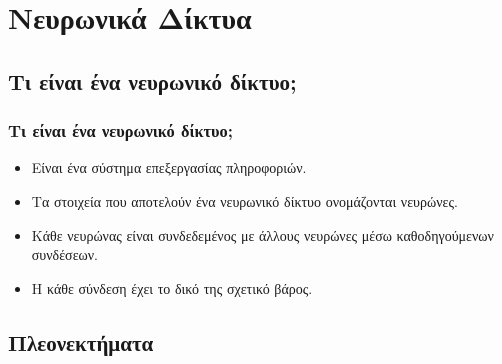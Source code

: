 \documentclass[xetex,serif,mathserif,14pt]{beamer}
\begin{document}
\section{Νευρωνικά Δίκτυα} %

\subsection{Τι είναι ένα νευρωνικό δίκτυο;}

\begin{frame}
\frametitle{Τι είναι ένα νευρωνικό δίκτυο;}
\begin{itemize}
\pause
  \item Είναι ένα σύστημα επεξεργασίας πληροφοριών.\pause
  \item Τα στοιχεία που αποτελούν ένα νευρωνικό δίκτυο ονομάζονται νευρώνες.\pause
  \item Κάθε νευρώνας είναι συνδεδεμένος με άλλους νευρώνες μέσω  καθοδηγούμενων  συνδέσεων.\pause
  \item  Η κάθε σύνδεση έχει το δικό της σχετικό βάρος.
\end{itemize}
\end{frame}


\subsection{Πλεονεκτήματα}
\end{document}
